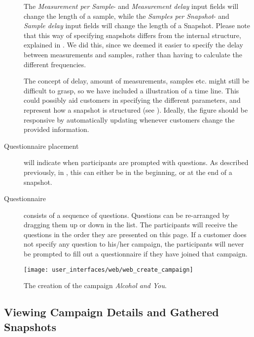 \begin{description}
    The \emph{Measurement per Sample}- and \emph{Measurement delay} input fields will change the length of a sample, while the \emph{Samples per Snapshot}- and \emph{Sample delay} input fields will change the length of a Snapshot. Please note that this way of specifying snapshots differs from the internal structure, explained in . We did this, since we deemed it easier to specify the delay between measurements and samples, rather than having to calculate the different frequencies.

    The concept of delay, amount of measurements, samples etc. might still be difficult to grasp, so we have included a illustration of a time line. This could possibly aid customers in specifying the different parameters, and represent how a snapshot is structured (see ). Ideally, the figure should be responsive by automatically updating whenever customers change the provided information.

    \item[Questionnaire placement] will indicate when participants are prompted with questions. As described previously, in , this can either be in the beginning, or at the end of a snapshot. 

    \item[Questionnaire] consists of a sequence of questions. Questions can be re-arranged by dragging them up or down in the list. The participants will receive the questions in the order they are presented on this page. If a customer does not specify any question to his/her campaign, the participants will never be prompted to fill out a questionnaire if they have joined that campaign.
\end{description}

\begin{figure}[!htbp]
\centering
\texttt{[image: user\_interfaces/web/web\_create\_campaign]}
\caption{The creation of the campaign \emph{Alcohol and You}.}
\label{fig:web_create_campaign}
\end{figure}
\FloatBarrier

\subsection{Viewing Campaign Details and Gathered Snapshots}
\label{sub:viewing_campaign_details}


